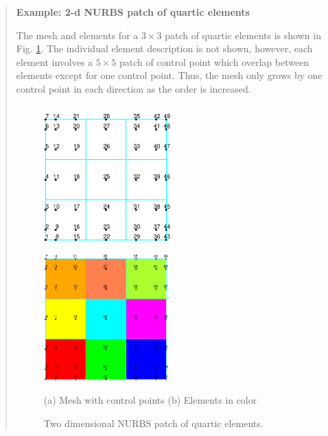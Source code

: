 \begin{quote}
\noindent
\textbf{Example: 2-d NURBS patch of quartic elements}

The mesh and elements for a $3 \times 3$ patch of quartic elements is
shown in Fig. \ref{fig5ex5}.  The individual element description is not
shown, however, each element involves a $5 \times 5$ patch of control
point which
overlap between elements except for one control point.  Thus, the mesh only grows
by one control point in each direction as the order is increased.

\begin{figure}[!t]
\begin{center}

\centerline{
\includegraphics[width=2.0in]{figs/mesh_4_mesh} \hspace{0.2in}
\includegraphics[width=2.0in]{figs/mesh_4_fill}
}

\centerline{(a) Mesh with control points \hspace{1in} (b) Elements in color}

\caption{Two dimensional NURBS patch of quartic elements.  \label{fig5ex5}}
\end{center}
\end{figure}
\end{quote}
